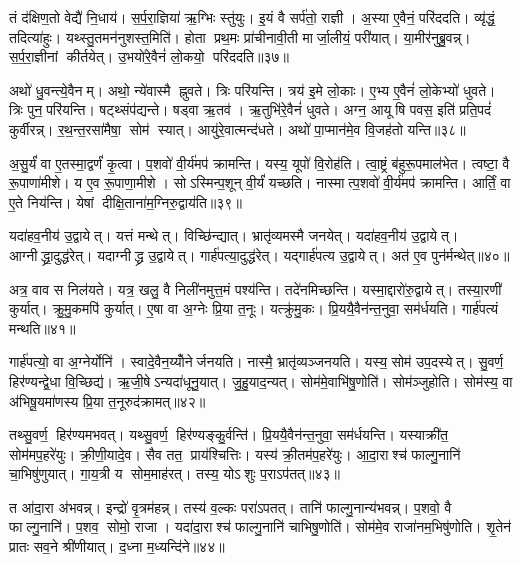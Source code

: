 तं द॑क्षिण॒तो वेद्यै॑ नि॒धाय॑। स॒र्प॒रा॒ज्ञिया॑ ऋ॒ग्भिः स्तु॑युः। इ॒यं वै सर्प॑तो॒ राज्ञी। अ॒स्या ए॒वैनं॒ परि॑ददति। व्यृ॑द्धं॒ तदित्या॑हुः। यथ्स्तु॒तमन॑नुशस्त॒मिति॑। होता प्रथ॒मः प्रा॑चीनावी॒ती मार्जा॒लीयं॒ परी॑यात्। या॒मीर॑नुब्रु॒वन्न्। स॒र्प॒रा॒ज्ञीनां कीर्तयेत्। उ॒भयो॑रे॒वैनं॑ लो॒कयो॒ परि॑ददति॥३७॥

अथो॑ धु॒वन्त्ये॒वैनम्। अथो॒ न्ये॑वास्मै ह्नुवते। त्रिः परि॑यन्ति। त्रय॑ इ॒मे लो॒काः। ए॒भ्य ए॒वैनं॑ लो॒केभ्यो॑ धुवते। त्रिः पुन॒परि॑यन्ति। षट्थ्संप॑द्यन्ते। षड्वा ऋ॒तव॑। ऋ॒तुभि॑रे॒वैनं॑ धुवते। अग्न॒ आयूषि पवस॒ इति॑ प्रति॒पदं॑ कुर्वीरन्न्। र॒थ॒न्त॒रसा॑मैषा॒ सोम॑ स्यात्। आयु॑रे॒वात्मन्द॑धते। अथो॑ पा॒प्मान॑मे॒व वि॒जह॑तो यन्ति॥३८॥\anuvakamend[अ॒भिजि॑त्यै पृथि॒व्याश्च॒ स्याद॑ध्व॒र्युर्ब्रू॑याल्लो॒कयो॒ परि॑ददति कुर्वीर॒स्त्रीणि॑ च]

अ॒सु॒र्यं॑ वा ए॒तस्मा॒द्वर्णं॑ कृ॒त्वा। प॒शवो॑ वी॒र्य॑मप॑ क्रामन्ति। यस्य॒ यूपो॑ वि॒रोह॑ति। त्वा॒ष्ट्रं ब॑हुरू॒पमाल॑भेत। त्वष्टा॒ वै रू॒पाणा॑मीशे। य ए॒व रू॒पाणा॒मीशे। सोऽस्मिन्प॒शून् वी॒र्यं॑ यच्छति। नास्मात्प॒शवो॑ वी॒र्य॑मप॑ क्रामन्ति। आर्तिं॒ वा ए॒ते निय॑न्ति। येषां दीक्षि॒ताना॑म॒ग्निरु॒द्वाय॑ति॥३९॥

यदा॑हव॒नीय॑ उ॒द्वायेत्। यत्तं मन्थेत्। विच्छि॑न्द्यात्। भ्रातृ॑व्यमस्मै जनयेत्। यदा॑हव॒नीय॑ उ॒द्वायेत्। आग्नीद्ध्रा॒दुद्ध॑रेत्। यदाग्नीद्ध्र उ॒द्वायेत्। गार्\mbox{}ह॑पत्या॒दुद्ध॑रेत्। यद्गार्\mbox{}ह॑पत्य उ॒द्वायेत्। अत॑ ए॒व पुन॑र्मन्थेत्॥४०॥

अत्र॒ वाव स निल॑यते। यत्र॒ खलु॒ वै निली॑नमुत्त॒मं पश्य॑न्ति। तदे॑नमिच्छन्ति। यस्मा॒द्दारो॑रु॒द्वायेत्। तस्या॒रणी॑ कुर्यात्। क्रु॒मु॒कमपि॑ कुर्यात्। ए॒षा वा अ॒ग्नेः प्रि॒या त॒नूः। यत्क्रु॑मु॒कः। प्रि॒ययै॒वैन॑न्त॒नुवा॒ सम॑र्धयति। गार्\mbox{}ह॑पत्यं मन्थति॥४१॥

गार्\mbox{}ह॑पत्यो॒ वा अ॒ग्नेर्योनि॑। स्वादे॒वैन॒य्योँनेर्जनयति। नास्मै॒ भ्रातृ॑व्यञ्जनयति। यस्य॒ सोम॑ उप॒दस्येत्। सु॒वर्ण॒ हिर॑ण्यन्द्वे॒धा वि॒च्छिद्य॑। ऋ॒जी॒षेऽन्यदा॑धूनु॒यात्। जु॒हु॒याद॒न्यत्। सोम॑मे॒वाभि॑षु॒णोति॑। सोम॑ञ्जुहोति। सोम॑स्य॒ वा अ॑भिषू॒यमा॑णस्य प्रि॒या त॒नूरुद॑क्रामत्॥४२॥

तथ्सु॒वर्ण॒ हिर॑ण्यमभवत्। यथ्सु॒वर्ण॒ हिर॑ण्यङ्कु॒र्वन्ति॑। प्रि॒ययै॒वैन॑न्त॒नुवा॒ सम॑र्धयन्ति। यस्याक्री॑त॒ सोम॑मप॒हरे॑युः। क्री॒णी॒यादे॒व। सैव तत॒ प्राय॑श्चित्तिः। यस्य॑ क्री॒तम॑प॒हरे॑युः। आ॒दा॒राश्च॑ फाल्गु॒नानि॑ चा॒भिषु॑णुयात्। गा॒य॒त्री य सोम॒माह॑रत्। तस्य॒ योऽशुः प॒राऽप॑तत्॥४३॥

त आ॑दा॒रा अ॑भवन्न्। इन्द्रो॑ वृ॒त्रम॑हन्न्। तस्य॑ व॒ल्कः परा॑ऽपतत्। तानि॑ फाल्गु॒नान्य॑भवन्न्। प॒शवो॒ वै फाल्गु॒नानि॑। प॒शव॒ सोमो॒ राजा। यदा॑दा॒राश्च॑ फाल्गु॒नानि॑ चाभिषु॒णोति॑। सोम॑मे॒व राजा॑नम॒भिषु॑णोति। शृ॒तेन॑ प्रातः सव॒ने श्री॑णीयात्। द॒ध्ना म॒ध्यन्दि॑ने॥४४॥

